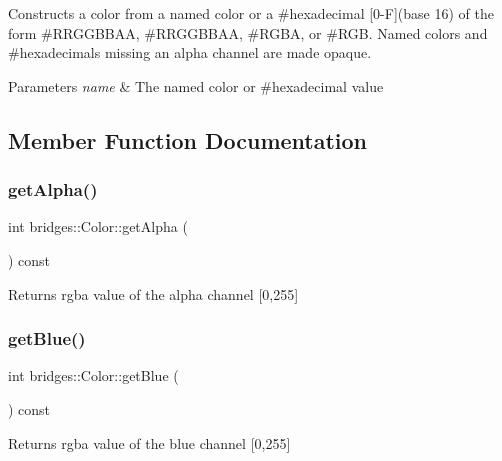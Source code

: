 Constructs a color from a named color or a \#hexadecimal \mbox{[}0-\/F\mbox{]}(base 16) of the form \#\+R\+R\+G\+G\+B\+B\+AA, \#\+R\+R\+G\+G\+B\+B\+AA, \#\+R\+G\+BA, or \#\+R\+GB. Named colors and \#hexadecimals missing an alpha channel are made opaque.


\begin{DoxyParams}{Parameters}
{\em name} & The named color or \#hexadecimal value \\
\hline
\end{DoxyParams}


\subsection{Member Function Documentation}
\mbox{\label{classbridges_1_1_color_a61523716f5597013d57bc98eae1fe96a}} 
\subsubsection{\texorpdfstring{get\+Alpha()}{getAlpha()}}
{\footnotesize\ttfamily int bridges\+::\+Color\+::get\+Alpha (\begin{DoxyParamCaption}{ }\end{DoxyParamCaption}) const\hspace{0.3cm}{\ttfamily [inline]}}

\begin{DoxyReturn}{Returns}
rgba value of the alpha channel \mbox{[}0,255\mbox{]} 
\end{DoxyReturn}
\mbox{\label{classbridges_1_1_color_aa7a70279f41f2cceb640162c43a2a382}} 
\subsubsection{\texorpdfstring{get\+Blue()}{getBlue()}}
{\footnotesize\ttfamily int bridges\+::\+Color\+::get\+Blue (\begin{DoxyParamCaption}{ }\end{DoxyParamCaption}) const\hspace{0.3cm}{\ttfamily [inline]}}

\begin{DoxyReturn}{Returns}
rgba value of the blue channel \mbox{[}0,255\mbox{]} 
\end{DoxyReturn}
\mbox{\label{classbridges_1_1_color_a93f8e016e1f1e6c177924ad8712e3e48}} 
